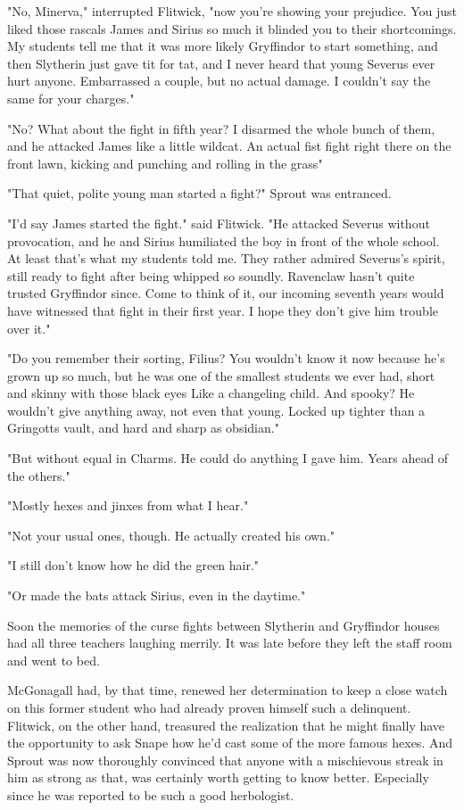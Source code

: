 "No, Minerva," interrupted Flitwick, "now you're showing your prejudice. You just liked those rascals James and Sirius so much it blinded you to their shortcomings. My students tell me that it was more likely Gryffindor to start something, and then Slytherin just gave tit for tat, and I never heard that young Severus ever hurt anyone. Embarrassed a couple, but no actual damage. I couldn't say the same for your charges."

"No? What about the fight in fifth year? I disarmed the whole bunch of them, and he attacked James like a little wildcat. An actual fist fight right there on the front lawn, kicking and punching and rolling in the grass{\el}"

"That quiet, polite young man started a fight?" Sprout was entranced.

"I'd say James started the fight." said Flitwick. "He attacked Severus without provocation, and he and Sirius humiliated the boy in front of the whole school. At least that's what my students told me. They rather admired Severus's spirit, still ready to fight after being whipped so soundly. Ravenclaw hasn't quite trusted Gryffindor since. Come to think of it, our incoming seventh years would have witnessed that fight in their first year. I hope they don't give him trouble over it."

"Do you remember their sorting, Filius? You wouldn't know it now because he's grown up so much, but he was one of the smallest students we ever had, short and skinny with those black eyes{\el} Like a changeling child. And spooky? He wouldn't give anything away, not even that young. Locked up tighter than a Gringotts vault, and hard and sharp as obsidian."

"But without equal in Charms. He could do anything I gave him. Years ahead of the others."

"Mostly hexes and jinxes from what I hear."

"Not your usual ones, though. He actually created his own."

"I still don't know how he did the green hair."

"Or made the bats attack Sirius, even in the daytime."

Soon the memories of the curse fights between Slytherin and Gryffindor houses had all three teachers laughing merrily. It was late before they left the staff room and went to bed.

McGonagall had, by that time, renewed her determination to keep a close watch on this former student who had already proven himself such a delinquent. Flitwick, on the other hand, treasured the realization that he might finally have the opportunity to ask Snape how he'd cast some of the more famous hexes. And Sprout was now thoroughly convinced that anyone with a mischievous streak in him as strong as that, was certainly worth getting to know better. Especially since he was reported to be such a good herbologist.

